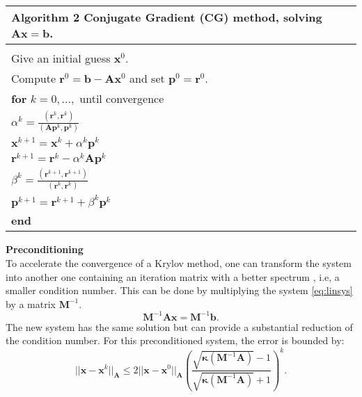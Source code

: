 \documentclass[12pt]{article}
\numberwithin{equation}{section}
\begin{document}
 \begin{table}[!h]
\begin{tabular}{ |l| } 
\hline
  \textbf{Algorithm 2} Conjugate Gradient (CG) method, solving $\mathbf{A}\mathbf{x}=\mathbf{b}$.\\
  \hline
 \hline
\\
Give an initial guess $\mathbf{x}^0$. \\Compute $\mathbf{r}^0=\mathbf{b}-\mathbf{A}\mathbf{x}^0$ and set $\mathbf{p}^0=\mathbf{r}^0$.\\

\hspace{0.5cm}\textbf{for} $k=0,...,$ until convergence\\
 \hspace{1cm} $\alpha^k=\frac{(\mathbf{r}^{k},\mathbf{r}^{k})}{(\mathbf{A}\mathbf{p}^k,\mathbf{p}^k)}$\\
\hspace{1cm} $\mathbf{x}^{k+1}=\mathbf{x}^k+\alpha^k\mathbf{p}^k$\\
\hspace{1cm}$\mathbf{r}^{k+1}=\mathbf{r}^k-\alpha^k\mathbf{A}\mathbf{p}^k$\\
\hspace{1cm}$ \beta^k=\frac{(\mathbf{r}^{k+1},\mathbf{r}^{k+1})}{(\mathbf{r}^k,\mathbf{r}^k)}$\\
\hspace{1cm}$\mathbf{p}^{k+1}=\mathbf{r}^{k+1}+\beta^k\mathbf{p}^k$\\
\hspace{0.5cm}\textbf{end}\\
\hline
\end{tabular}
\end{table}
\newpage
\textbf{Preconditioning}\\
\hspace{0.5cm}To accelerate the convergence of a Krylov method, one can transform the system into
another one containing an iteration matrix with a better spectrum , i.e, a smaller condition number. 
This can be done by multiplying the system \eqref{eq:linsys} by a matrix $\mathbf{M}^{-1}.$
\begin{equation}\label{eq:precon}
 \mathbf{M}^{-1}\mathbf{A}\mathbf{x}=\mathbf{M}^{-1}\mathbf{b}.
\end{equation}
The new system has the same solution but can provide a substantial reduction of the condition number. 
For this preconditioned system, the error is bounded by:
\begin{equation}\label{eq:convp}
 ||\mathbf{x}-\mathbf{x}^{k}||_\mathbf{A}\leq 2||\mathbf{x}-\mathbf{x}^{0}||_\mathbf{A} 
 \left( \frac{\sqrt{\mathbf{\kappa}(\mathbf{M}^{-1}\mathbf{A})}-1}{\sqrt{\mathbf{\kappa}(\mathbf{M}^{-1}\mathbf{A})}+1} \right)^{k}.
\end{equation}
\end{document}
